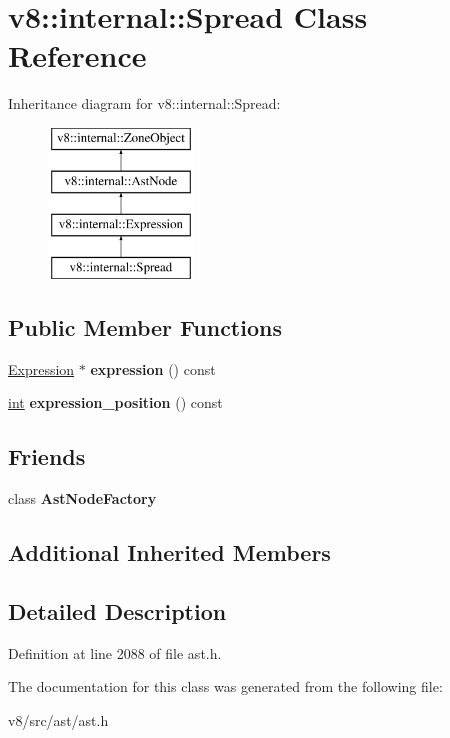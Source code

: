 \hypertarget{classv8_1_1internal_1_1Spread}{}\section{v8\+:\+:internal\+:\+:Spread Class Reference}
\label{classv8_1_1internal_1_1Spread}
Inheritance diagram for v8\+:\+:internal\+:\+:Spread\+:\begin{figure}[H]
\begin{center}
\leavevmode
\includegraphics[height=4.000000cm]{classv8_1_1internal_1_1Spread}
\end{center}
\end{figure}
\subsection*{Public Member Functions}
\begin{DoxyCompactItemize}
\item 
\mbox{\label{classv8_1_1internal_1_1Spread_a68650ec2b5efed3e946342287ba5a13e}} 
\mbox{\hyperlink{classv8_1_1internal_1_1Expression}{Expression}} $\ast$ {\bfseries expression} () const
\item 
\mbox{\label{classv8_1_1internal_1_1Spread_a88e5083830a9e10db6a171a0d0e5e5f0}} 
\mbox{\hyperlink{classint}{int}} {\bfseries expression\+\_\+position} () const
\end{DoxyCompactItemize}
\subsection*{Friends}
\begin{DoxyCompactItemize}
\item 
\mbox{\label{classv8_1_1internal_1_1Spread_a8d587c8ad3515ff6433eb83c578e795f}} 
class {\bfseries Ast\+Node\+Factory}
\end{DoxyCompactItemize}
\subsection*{Additional Inherited Members}


\subsection{Detailed Description}


Definition at line 2088 of file ast.\+h.



The documentation for this class was generated from the following file\+:\begin{DoxyCompactItemize}
\item 
v8/src/ast/ast.\+h\end{DoxyCompactItemize}
